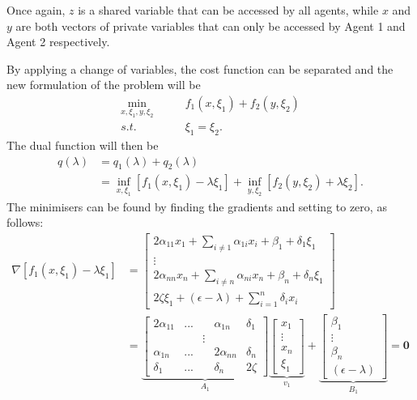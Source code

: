 \documentclass[12pt]{article}
\begin{document}
Once again, $z$ is a shared variable that can be accessed by all agents, while $x$ and $y$ are both vectors of private variables that can only be accessed by Agent 1 and Agent 2 respectively.

By applying a change of variables, the cost function can be separated and the new formulation of the problem will be
\begin{align*}
\min_{x,\xi_1,y,\xi_2}\qquad& f_1(x,\xi_1)+f_2(y,\xi_2)\\
s.t.\qquad&\xi_1=\xi_2.
\end{align*}
The dual function will then be
\begin{align*}
q(\lambda)&=q_1(\lambda)+q_2(\lambda)\\
&=\inf_{x,\xi_1}[f_1(x,\xi_1)-\lambda\xi_1]+\inf_{y,\xi_2}[f_2(y,\xi_2)+\lambda\xi_2].
\end{align*}
The minimisers can be found by finding the gradients and setting to zero, as follows:
\begin{align*}
\nabla [f_1(x,\xi_1)-\lambda\xi_1]&=\begin{bmatrix}2\alpha_{11}x_1+\sum\limits_{i\neq1} \alpha_{1i}x_i+\beta_1+\delta_1\xi_1\\ \vdots\\ 2\alpha_{nn}x_n+\sum\limits_{i\neq n} \alpha_{ni}x_n+\beta_n+\delta_n\xi_1\\2\zeta\xi_1+(\epsilon-\lambda)+\sum\limits_{i=1}^n \delta_ix_i\end{bmatrix}\\
&=\underbrace{\begin{bmatrix}2\alpha_{11}&...&&\alpha_{1n}&\delta_1\\&& \vdots\\ \alpha_{1n}&...&&2\alpha_{nn}&\delta_n\\\delta_1&...&&\delta_n&2\zeta\end{bmatrix}}_{A_1} \underbrace{\begin{bmatrix}x_1\\ \vdots\\ x_n\\\xi_1\end{bmatrix}}_{v_1}+\underbrace{\begin{bmatrix}\beta_1\\ \vdots\\ \beta_n\\(\epsilon-\lambda)\end{bmatrix}}_{B_1}=\textbf{0}
\end{align*}
\end{document}
